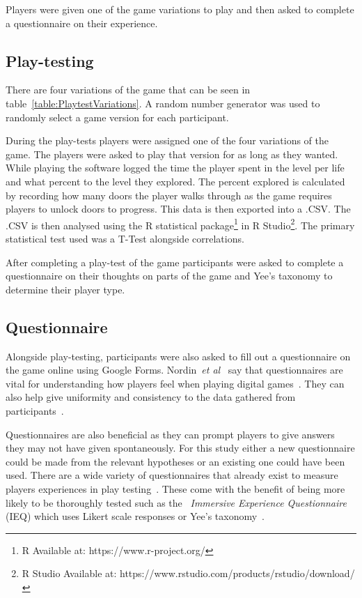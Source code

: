 \documentclass[journal]{IEEEtran}
\begin{document}
	Players were given one of the game variations to play and then asked to complete a questionnaire on their experience. 
	
	\subsection{Play-testing}
	There are four variations of the game that can be seen in table~\ref{table:PlaytestVariations}.  A random number generator was used to randomly select a game version for each participant.    
	
	During the play-tests players were assigned one of the four variations of the game. The players were asked to play that version for as long as they wanted. While playing the software logged the time the player spent in the level per life and what percent to the level they explored. The percent explored is calculated by recording how many doors the player walks through as the game requires players to unlock doors to progress. This data is then exported into a .CSV. The .CSV is then analysed using the R statistical package\footnote[2]{R Available at: https://www.r-project.org/} in R Studio\footnote[3]{R Studio Available at: https://www.rstudio.com/products/rstudio/download/}.  The primary statistical test used was a T-Test alongside correlations.
	
	After completing a play-test of the game participants were asked to complete a questionnaire on their thoughts on parts of the game and Yee's taxonomy to determine their player type.
	
	\subsection{Questionnaire} \label{Questionnaire}
	
	Alongside play-testing, participants were also asked to fill out a questionnaire on the game online using Google Forms. Nordin~\textit{et al}~\cite{nordin2014} say that questionnaires are vital for understanding how players feel when playing digital games~\cite{nordin2014,Denisova2016}. They can also help give uniformity and consistency to the data gathered from participants~\cite{Denisova2016}.
	
	Questionnaires are also beneficial as they can prompt players to give answers they may not have given spontaneously. For this study either a new questionnaire could be made from the relevant hypotheses or an existing one could have been used. There are a wide variety of questionnaires that already exist to measure players experiences in play testing~\cite{nordin2014, Jennett2008}. These come with the benefit of being more likely to be thoroughly tested such as the~\textit{ Immersive Experience Questionnaire} (IEQ) which uses Likert scale responses or Yee's taxonomy~\cite{nordin2014, Jennett2008, Yee2006, Yee2012}.
	
\end{document}
